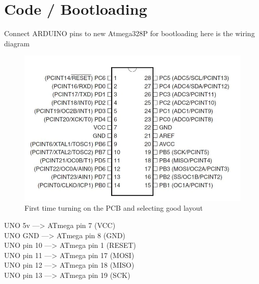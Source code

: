 \documentclass[a4paper,11pt]{article}%
\begin{document}
\section{Code / Bootloading }
Connect ARDUINO pins to new Atmega328P for bootloading
here is the wiring diagram
\begin{figure}[H]
	\centering
	\includegraphics[scale=0.6]{figures/bootload1.png}
	\caption{First time turning on the PCB and selecting good layout}
\end{figure}

UNO 5v ---> ATmega pin 7 (VCC)\\
UNO GND ---> ATmega pin 8 (GND)\\
UNO pin 10 ---> ATmega pin 1 (RESET)\\
UNO pin 11 ---> ATmega pin 17 (MOSI)\\
UNO pin 12 ---> ATmega pin 18 (MISO)\\
UNO pin 13 ---> ATmega pin 19 (SCK)\\
\end{document}
